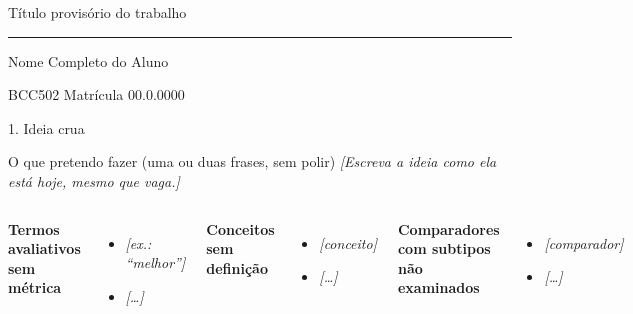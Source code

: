 \documentclass[aspectratio=169,11pt]{beamer}
\newcommand{\titulotrabalho}{Título provisório do trabalho}
\newcommand{\nomealuno}{Nome Completo do Aluno}
\newcommand{\matricula}{00.0.0000}
\newcommand{\rotulo}[1]{\textcolor{maccent}{\small\bfseries #1}}
\newcommand{\preencher}[1]{\textcolor{mplace}{\textit{[#1]}}}
\begin{document}
\begin{frame}[plain,c]
  \relax
  {\titulotrabalho\par}
  \vskip 0.35cm
  \textcolor{maccent}{\rule{1.1cm}{1.5pt}}
  \vskip 0.5cm
  {\large \nomealuno\par}
  \vskip 0.15cm
  {\small\color{mgray} BCC502 \textperiodcentered{} Matrícula \matricula\par}
\end{frame}
\setcounter{framenumber}{0}

\begin{frame}[t]{1. Ideia crua}
  \begin{bloco}{O que pretendo fazer (uma ou duas frases, sem polir)}
    \preencher{Escreva a ideia como ela está hoje, mesmo que vaga.}
  \end{bloco}

  \vspace{0.5cm}
  \begin{columns}[T]
      \rotulo{Termos avaliativos sem métrica}
      \begin{itemize}\small
        \item \preencher{ex.: \enquote{melhor}}
        \item \preencher{\dots}
      \end{itemize}
      \rotulo{Conceitos sem definição}
      \begin{itemize}\small
        \item \preencher{conceito}
        \item \preencher{\dots}
      \end{itemize}
      \rotulo{Comparadores com subtipos não examinados}
      \begin{itemize}\small
        \item \preencher{comparador}
        \item \preencher{\dots}
      \end{itemize}
  \end{columns}
\end{frame}
\end{document}
